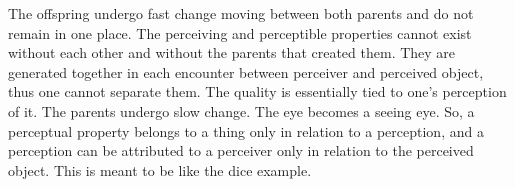 \documentclass[oneside]{article}
\begin{document}
The offspring undergo fast change moving between both parents and do not remain in one place. The perceiving and perceptible properties cannot exist without each other and without the parents that created them. They are generated together in each encounter between perceiver and perceived object, thus one cannot separate them. The quality is essentially tied to one's perception of it. The parents undergo slow change. The eye becomes a seeing eye. So, a perceptual property belongs to a thing only in relation to a perception, and a perception can be attributed to a perceiver only in relation to the perceived object. This is meant to be like the dice example. 
\end{document}

